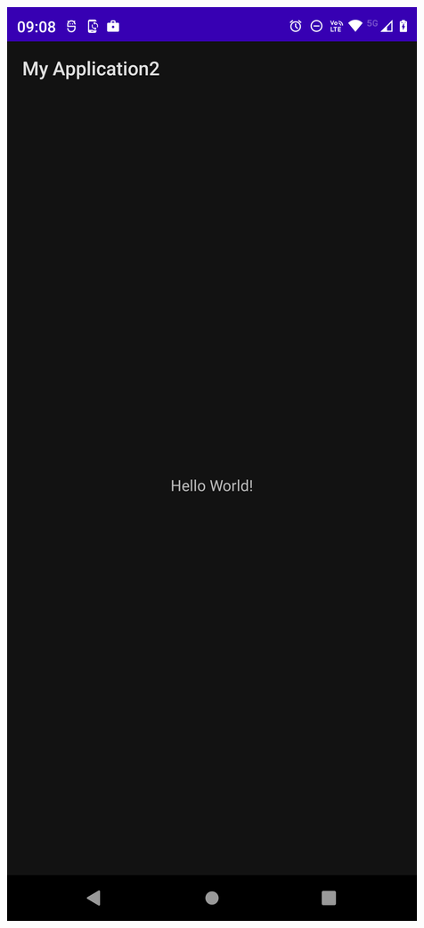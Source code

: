 \begin{frame}
\begin{columns}
\begin{center}
\includegraphics[width=0.95\linewidth]{01_Configurar/Etapa1_fase1.png}    
\end{center}
\end{columns} 
\end{frame}

